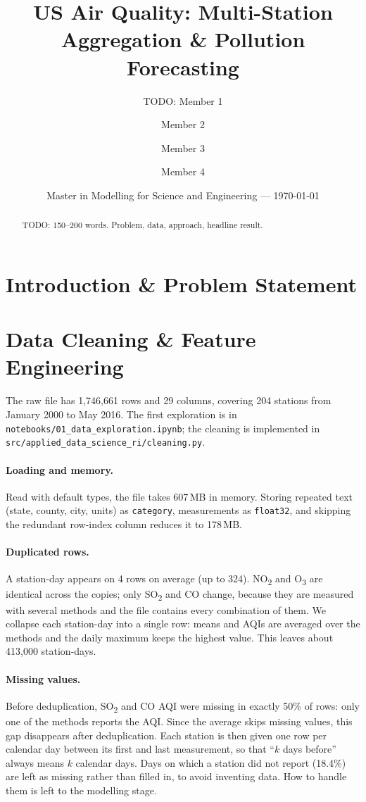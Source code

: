 \documentclass[11pt,a4paper]{article}
\title{US Air Quality: Multi-Station Aggregation \& Pollution Forecasting}
\author{TODO: Member 1 \and Member 2 \and Member 3 \and Member 4}
\date{Master in Modelling for Science and Engineering --- \today}
\begin{document}
\maketitle

\begin{abstract}
TODO: 150--200 words. Problem, data, approach, headline result.
\end{abstract}

\section{Introduction \& Problem Statement}

\section{Data Cleaning \& Feature Engineering}

The raw file has 1{,}746{,}661 rows and 29 columns, covering 204 stations from
January 2000 to May 2016. The first exploration is in
\texttt{notebooks/01\_data\_exploration.ipynb}; the cleaning is implemented in
\texttt{src/applied\_data\_science\_ri/cleaning.py}.

\paragraph{Loading and memory.} Read with default types, the file takes 607\,MB in
memory. Storing repeated text (state, county, city, units) as \texttt{category},
measurements as \texttt{float32}, and skipping the redundant row-index column
reduces it to 178\,MB.

\paragraph{Duplicated rows.} A station-day appears on 4 rows on average (up to 324).
NO\textsubscript{2} and O\textsubscript{3} are identical across the copies; only
SO\textsubscript{2} and CO change, because they are measured with several methods
and the file contains every combination of them. We collapse each station-day into
a single row: means and AQIs are averaged over the methods and the daily maximum
keeps the highest value. This leaves about 413{,}000 station-days.

\paragraph{Missing values.} Before deduplication, SO\textsubscript{2} and CO AQI were
missing in exactly 50\% of rows: only one of the methods reports the AQI. Since the
average skips missing values, this gap disappears after deduplication. Each station
is then given one row per calendar day between its first and last measurement, so
that ``$k$ days before'' always means $k$ calendar days. Days on which a station did
not report (18.4\%) are left as missing rather than filled in, to avoid inventing
data. How to handle them is left to the modelling stage.
\end{document}
